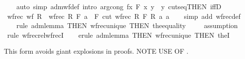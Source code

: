 \begin{isabellebody}
%
\isadelimproof
\ \ %
\endisadelimproof
%
\isatagproof
{}\isamarkupfalse%
\ {\isacharparenleft}{\kern0pt}auto\ simp{\isacharcolon}{\kern0pt}\ adm{\isacharunderscore}{\kern0pt}wf{\isacharunderscore}{\kern0pt}def\ intro{\isacharbang}{\kern0pt}{\isacharcolon}{\kern0pt}\ arg{\isacharunderscore}{\kern0pt}cong{\isacharbrackleft}{\kern0pt}\ f{\isacharequal}{\kern0pt}{\isachardoublequoteopen}{\isasymlambda}x{\isachardot}{\kern0pt}\ F\ x\ y{\isachardoublequoteclose}\ \ y{\isacharbrackright}{\kern0pt}\ cuts{\isacharunderscore}{\kern0pt}eq{\isacharbrackleft}{\kern0pt}THEN\ iffD{}{\isacharbrackright}{\kern0pt}{\isacharparenright}{\kern0pt}%
\endisatagproof
{\isafoldproof}%
%
\isadelimproof
\isanewline
%
\endisadelimproof
\isanewline
{}\isamarkupfalse%
\ wfrec{\isacharcolon}{\kern0pt}\ {\isachardoublequoteopen}wf\ R\ {\isasymLongrightarrow}\ wfrec\ R\ F\ a\ {\isacharequal}{\kern0pt}\ F\ {\isacharparenleft}{\kern0pt}cut\ {\isacharparenleft}{\kern0pt}wfrec\ R\ F{\isacharparenright}{\kern0pt}\ R\ a{\isacharparenright}{\kern0pt}\ a{\isachardoublequoteclose}\isanewline
%
\isadelimproof
\ \ %
\endisadelimproof
%
\isatagproof
{}\isamarkupfalse%
\ {\isacharparenleft}{\kern0pt}simp\ add{\isacharcolon}{\kern0pt}\ wfrec{\isacharunderscore}{\kern0pt}def{\isacharparenright}{\kern0pt}\isanewline
\ \ \isamarkupfalse%
\ {\isacharparenleft}{\kern0pt}rule\ adm{\isacharunderscore}{\kern0pt}lemma\ {\isacharbrackleft}{\kern0pt}THEN\ wfrec{\isacharunderscore}{\kern0pt}unique{\isacharcomma}{\kern0pt}\ THEN\ the{}{\isacharunderscore}{\kern0pt}equality{\isacharbrackright}{\kern0pt}{\isacharparenright}{\kern0pt}\isanewline
\ \ \ \isamarkupfalse%
\ assumption\isanewline
\ \ \isamarkupfalse%
\ {\isacharparenleft}{\kern0pt}rule\ wfrec{\isacharunderscore}{\kern0pt}rel{\isachardot}{\kern0pt}wfrecI{\isacharparenright}{\kern0pt}\isanewline
\ \ \isamarkupfalse%
\ {\isacharparenleft}{\kern0pt}erule\ adm{\isacharunderscore}{\kern0pt}lemma\ {\isacharbrackleft}{\kern0pt}THEN\ wfrec{\isacharunderscore}{\kern0pt}unique{\isacharcomma}{\kern0pt}\ THEN\ theI{\isacharprime}{\kern0pt}{\isacharbrackright}{\kern0pt}{\isacharparenright}{\kern0pt}\isanewline
\ \ \isamarkupfalse%
%
\endisatagproof
{\isafoldproof}%
%
\isadelimproof
%
\endisadelimproof
%
\begin{isamarkuptext}%
This form avoids giant explosions in proofs.  NOTE USE OF \isa{{\isasymequiv}}.%
\end{isamarkuptext}\isamarkuptrue%

\end{isabellebody}
